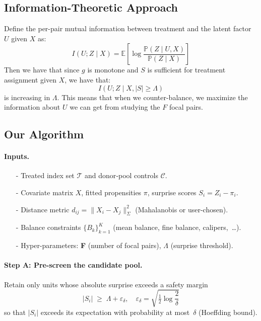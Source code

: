 \documentclass[12pt,letterpaper]{article}  %
\begin{document}
\subsection*{Information-Theoretic Approach}

Define the per-pair mutual information between treatment and the latent factor $U$ given $X$ as:
\begin{equation*}
    I(U; Z \mid X) = \mathbb{E}\left[ \log \frac{\mathbb{P}(Z\mid U, X)}{\mathbb{P}(Z \mid X)} \right]
\end{equation*}
Then we have that since $g$ is monotone and $S$ is sufficient for treatment assignment given $X$, we have that:
\begin{equation*}
    I(U; Z \mid X, |S| \geq \Lambda)
\end{equation*}
is increasing in $\Lambda$. This means that when we counter-balance, we maximize the information about $U$ we can get from studying the $F$ focal pairs.

\subsection*{Our Algorithm}

\paragraph{Inputs.}
\begin{itemize}[leftmargin=1.3em]
    \item[-] Treated index set $\mathcal{T}$ and donor‐pool controls $\mathcal{C}$.
    \item[-] Covariate matrix $X$, fitted propensities $\pi$, surprise scores $S_i = Z_i-\pi_i$.
    \item[-] Distance metric $d_{ij}=\|X_i-X_j\|_\Sigma^2$ (Mahalanobis or user-chosen).
    \item[-] Balance constraints $\{B_k\}_{k=1}^K$ (mean balance, fine balance, calipers,~…).
    \item[-] Hyper-parameters: \textbf{F} (number of focal pairs), $\Lambda$ (surprise threshold).
\end{itemize}

\paragraph{Step A: Pre-screen the candidate pool.}
Retain only units whose absolute surprise exceeds a safety margin
\[
|S_i|\;\ge\;\Lambda+\varepsilon_\delta,
\quad
\varepsilon_\delta=\sqrt{\tfrac12\log\!\frac{2}{\delta}}
\]
so that $|S_i|$ exceeds its expectation with probability at most~$\delta$
(Hoeffding bound).
\end{document}
